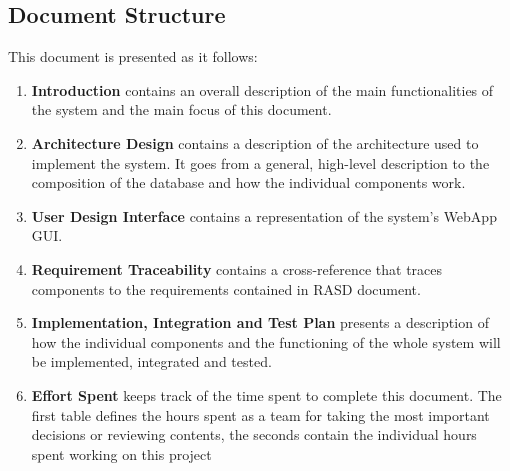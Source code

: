 \subsection{Document Structure}
This document is presented as it follows:
\begin{enumerate}
    \item \textbf{Introduction} contains an overall description of the main functionalities of the system and the main focus of this document.
    \item \textbf{Architecture Design} contains a description of the architecture used to implement the system. It goes from a general, high-level description to the composition of the database and how the individual components work.
    \item \textbf{User Design Interface} contains a representation of the system's WebApp GUI.
    \item \textbf{Requirement Traceability} contains a cross-reference that traces components to the requirements contained in RASD document.
    \item \textbf{Implementation, Integration and Test Plan} presents a description of how the individual components and the functioning of the whole system will be implemented, integrated and tested.
    \item \textbf{Effort Spent} keeps track of the time spent to complete this document. The first table defines the hours spent as a team for taking the most important decisions or reviewing contents, the seconds contain the individual hours spent working on this project
\end{enumerate}